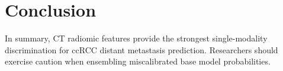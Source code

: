 \section{Conclusion}
\label{sec:conclusion}
In summary, CT radiomic features provide the strongest single-modality discrimination for ccRCC distant metastasis prediction. Researchers should exercise caution when ensembling miscalibrated base model probabilities.
